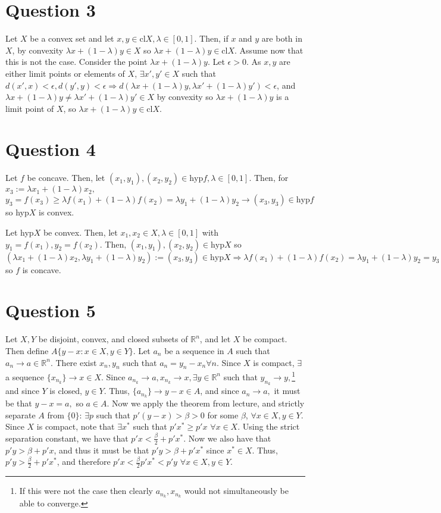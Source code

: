 \documentclass[11pt]{article} %
\begin{document}
\section{Question 3}
Let $X$ be a convex set and let $x,y\in \text{cl} X,\lambda \in [0,1].$ Then, if $x$ and $y$ are both in $X$, by convexity $\lambda x+(1-\lambda)y\in X$ so $\lambda x+(1-\lambda)y\in \text{cl}X$. Assume now that this is not the case. Consider the point $\lambda x+(1-\lambda)y.$ Let $\epsilon>0.$ As $x,y$ are either limit points or elements of $X$, $\exists x',y'\in X$ such that $d(x',x)<\epsilon,d(y',y)<\epsilon \Rightarrow d(\lambda x+(1-\lambda)y,\lambda x'+(1-\lambda)y')<\epsilon$, and $\lambda x+(1-\lambda)y \neq \lambda x'+(1-\lambda)y' \in X$ by convexity so $\lambda x+(1-\lambda)y$ is a limit point of $X$, so $\lambda x+(1-\lambda)y \in \text{cl}X$.

\section{Question 4}
Let $f$ be concave. Then, let $(x_1,y_1),(x_2,y_2) \in \text{hyp} f, \lambda \in [0,1].$ Then, for $x_3:=\lambda x_1 +(1-\lambda )x_2,$ $y_3 =f(x_3)\geq \lambda f(x_1) + (1-\lambda) f(x_2) = \lambda y_1 + (1-\lambda)y_2 \rightarrow (x_3,y_3) \in \text{hyp} f$ so hyp$X$ is convex.

Let hyp$X$ be convex. Then, let $x_1,x_2 \in X,\lambda \in [0,1]$ with $y_1 = f(x_1),y_2 = f(x_2)$. Then, $(x_1,y_1),(x_2,y_2) \in \text{hyp} X$ so $(\lambda x_1 + (1-\lambda)x_2 , \lambda y_1 + (1-\lambda)y_2):= (x_3,y_3) \in \text{hyp}X \Rightarrow \lambda f(x_1) + (1-\lambda)f(x_2)= \lambda y_1 + (1-\lambda)y_2 =y_3 \leq f(x_3) = f(\lambda x_1 + (1-\lambda)x_2 )$ so $f$ is concave.

\section{Question 5}
Let $X,Y$ be disjoint, convex, and closed subsets of $\mathbb{R}^n$, and let $X$ be compact. Then define $A \{ y-x : x\in X, y \in Y\}.$ Let $a_n$ be a sequence in $A$ such that $a_n \rightarrow a \in \mathbb{R}^n$. There exist $x_n,y_n$ such that $a_n = y_n - x_n \forall n.$ Since $X$ is compact, $\exists$ a sequence $\{ x_{n_k}\}\rightarrow x\in X$. Since $a_{n_k} \rightarrow a,x_{n_k} \rightarrow x, \exists y \in \mathbb{R}^n$ such that $y_{n_k} \rightarrow y,$\footnote{If this were not the case then clearly $a_{n_k},x_{n_k}$ would not simultaneously be able to converge.} and since $Y$ is closed, $y\in Y$. Thus, $\{ a_{n_k} \} \rightarrow y-x \in A$, and since $a_n \rightarrow a,$ it must be that $y-x = a,$ so $a \in A$. Now we apply the theorem from lecture, and strictly separate $A$ from $\{ 0\}$: $\exists p$ such that $p'(y-x)>\beta>0$ for some $\beta$, $\forall x\in X,y\in Y.$ Since $X$ is compact, note that $\exists x^{*}$ such that $p'x^{*}\geq p'x$ $\forall x\in X$. Using the strict separation constant, we have that $p'x<\frac{\beta}{2}+p'x^{*}.$ Now we also have that $p'y>\beta +p'x$, and thus it must be that $p'y>\beta +p'x^{*}$ since $x^{*}\in X$. Thus, $p'y>\frac{\beta}{2} +p'x^{*}$, and therefore $p'x<\frac{\beta}{2}p'x^{*}<p'y$ $\forall x\in X, y\in Y.$
\end{document}
